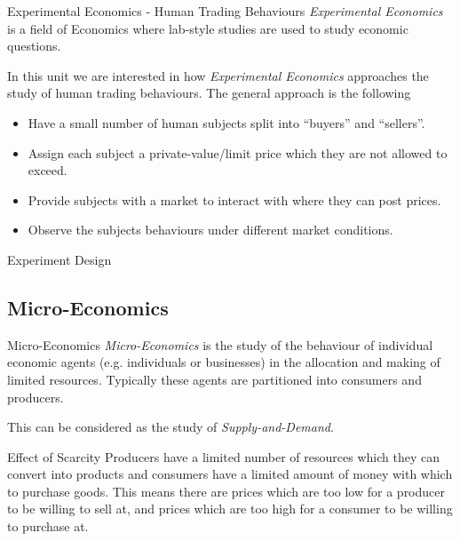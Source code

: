 \documentclass[11pt,a4paper]{article}
\begin{document}
  \begin{remark}{Experimental Economics - Human Trading Behaviours}
    \textit{Experimental Economics} is a field of Economics where lab-style studies are used to study economic questions.
    \par In this unit we are interested in how \textit{Experimental Economics} approaches the study of human trading behaviours. The general approach is the following
    \begin{itemize}
      \item Have a small number of human subjects split into ``buyers'' and ``sellers''.
      \item Assign each subject a private-value/limit price which they are not allowed to exceed.
      \item Provide subjects with a market to interact with where they can post prices.
      \item Observe the subjects behaviours under different market conditions.
    \end{itemize}
  \end{remark}

  \begin{proposition}{Experiment Design}

  \end{proposition}

\subsection{Micro-Economics} \label{sec_MicroEconomics}

  \begin{definition}{Micro-Economics}
      \textit{Micro-Economics} is the study of the behaviour of individual economic agents (e.g. individuals or businesses) in the allocation and making of limited resources. Typically these agents are partitioned into consumers and producers.
      \par This can be considered as the study of \textit{Supply-and-Demand}.
  \end{definition}

  \begin{remark}{Effect of Scarcity}
    Producers have a limited number of resources which they can convert into products and consumers have a limited amount of money with which to purchase goods. This means there are prices which are too low for a producer to be willing to sell at, and prices which are too high for a consumer to be willing to purchase at.
  \end{remark}
\end{document}
